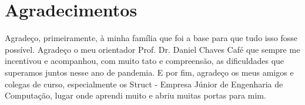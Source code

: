 \chapter*{Agradecimentos}

Agradeço, primeiramente, à minha família que foi a base para que tudo isso fosse possível. Agradeço o meu orientador Prof. Dr. Daniel Chaves Café que sempre me incentivou e acompanhou, com muito tato e compreensão, as dificuldades que superamos juntos nesse ano de pandemia. E por fim, agradeço os meus amigos e colegas de curso, especialmente os Struct - Empresa Júnior de Engenharia de Computação, lugar onde aprendi muito e abriu muitas portas para mim. 